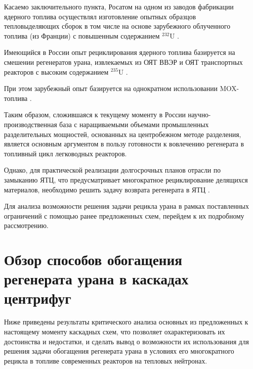 Касаемо заключительного пункта, Росатом на одном из заводов фабрикации ядерного топлива осуществлял изготовление опытных образцов тепловыделяющих сборок в том числе на основе зарубежного облученного топлива (из Франции) с повышенным содержанием $^{232}$U \cite{kislovRadiacionnyeAspektyIspolzovaniya}.

Имеющийся в России опыт рециклирования ядерного топлива базируется на смешении регенератов урана, извлекаемых из ОЯТ ВВЭР и ОЯТ транспортных реакторов с высоким содержанием $^{235}$U \cite{international2003iaea}.

При этом зарубежный опыт базируется на однократном использовании MOX-топлива \cite{international2003iaea}.


Таким образом, сложившаяся к текущему моменту в России научно-производственная база с наращиваемыми объемами промышленных разделительных мощностей, основанных на центробежном методе разделения, является основным аргументом в пользу готовности к вовлечению регенерата в топливный цикл легководных реакторов.

Однако, для практической реализации долгосрочных планов отрасли по замыканию ЯТЦ, что предусматривает многократное рециклирование делящихся материалов, необходимо решить задачу возврата регенерата в ЯТЦ \cite{RosatomGoskorporaciyaRosatoma,panteleyOsobennostiMezhdunarodnogoSotrudnichestva2017}.

Для анализа возможности решения задачи рецикла урана в рамках поставленных ограничений с помощью ранее предложенных схем, перейдем к их подробному рассмотрению.

\section{Обзор способов обогащения регенерата урана в каскадах центрифуг}

Ниже приведены результаты критического анализа основных из предложенных к настоящему моменту каскадных схем, что позволяет охарактеризовать их достоинства и недостатки,  и сделать вывод о возможности их использования для решения задачи обогащения регенерата урана в условиях его многократного рецикла в топливе современных реакторов на тепловых нейтронах.

